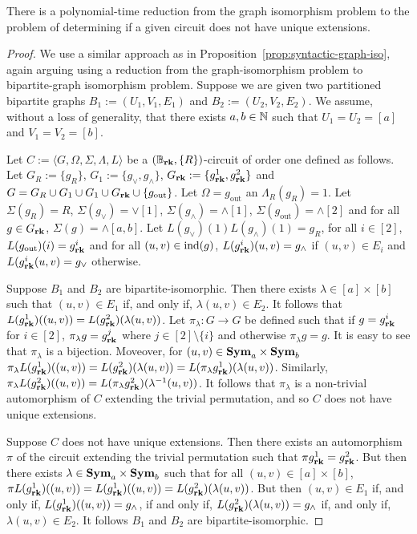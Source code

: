 \documentclass[../paper.tex]{subfiles}
\begin{document}
\begin{lem}
  There is a polynomial-time reduction from the graph isomorphism problem to the
  problem of determining if a given circuit does not have unique extensions.
  \label{lem:unique-extensions-hard}
\end{lem}
\begin{proof}
  We use a similar approach as in Proposition~\ref{prop:syntactic-graph-iso},
  again arguing using a reduction from the graph-isomorphism problem to
  bipartite-graph isomorphism problem. Suppose we are given two partitioned
  bipartite graphs $B_1 := (U_1, V_1, E_1)$ and $B_2 := (U_2, V_2, E_2)$. We
  assume, without a loss of generality, that there exists $a, b \in \mathbb{N}$ such
  that $U_1 = U_2 = [a]$ and $V_1 = V_2 = [b]$.

  Let $C := \langle G, \Omega, \Sigma, \Lambda, L \rangle$ be a $(\mathbb{B}_{\text{\textbf{rk}}},
  \{R\})$-circuit of order one defined as follows. Let $G_R := \{g_R\}$, $G_1 :=
  \{ g_{\lor}, g_{\land} \}$, $G_{\text{\textbf{rk}}} := \{ g^1_{\text{\textbf{rk}}}, g^2_{\text{\textbf{rk}}} \}$ and
  $G = G_R \cup G_1 \cup G_1 \cup G_{\text{\textbf{rk}}} \cup \{ g_{\text{out}} \}$. Let
  $\Omega = g_{\text{out}}$ an $\Lambda_R (g_R) = 1$. Let $\Sigma (g_R) = R$,
  $\Sigma (g_\lor) = \lor[1]$, $\Sigma (g_\land) = \land[1]$, $\Sigma
  (g_{\text{out}}) = \land[2]$ and for all $g \in G_{\text{\textbf{rk}}}$, $\Sigma (g) =
  \land[a,b]$. Let $L(g_\lor)(1) L(g_\land)(1) = g_R$, for all $i \in [2]$,
  $L(g_{\text{out}})(i) = g^i_{\text{\textbf{rk}}}$ and for all $(u, v) \in \text{\upshape ind}(g)$,
  $L(g^i_{\text{\textbf{rk}}})(u,v) = g_{\land}$ if $(u, v) \in E_i$ and $L(g^i_{\text{\textbf{rk}}} (u,v)
  = g_{\lor}$ otherwise.

  Suppose $B_1$ and $B_2$ are bipartite-isomorphic. Then there exists $\lambda
  \in [a] \times [b]$ such that $(u,v) \in E_1$ if, and only if, $\lambda (u,v)
  \in E_2$. It follows that $L(g^1_{\text{\textbf{rk}}})((u,v)) =
  L(g^2_{\text{\textbf{rk}}})(\lambda(u,v))$. Let $\pi_{\lambda}: G \rightarrow G$ be defined
  such that if $g = g^i_{\text{\textbf{rk}}}$ for $i \in [2]$, $\pi_{\lambda} g =
  g^j_{\text{\textbf{rk}}}$ where $j \in [2] \setminus \{i\}$ and otherwise $\pi_{\lambda} g
  = g$. It is easy to see that $\pi_{\lambda}$ is a bijection. Moveover, for
  $(u,v) \in \text{\textbf{Sym}}_a \times \text{\textbf{Sym}}_b$ $\pi_{\lambda} L(g^1_{\text{\textbf{rk}}})((u,v)) =
  L(g^2_{\text{\textbf{rk}}})(\lambda (u,v)) = L(\pi_\lambda g^1_{\text{\textbf{rk}}})(\lambda (u,v))$.
  Similarly, $\pi_\lambda L(g^2_{\text{\textbf{rk}}})((u,v)) =
  L(\pi_{\lambda}g^2_{\text{\textbf{rk}}})(\lambda^{-1}(u,v))$. It follows that $\pi_\lambda$
  is a non-trivial automorphism of $C$ extending the trivial permutation, and so
  $C$ does not have unique extensions.

  Suppose $C$ does not have unique extensions. Then there exists an automorphism
  $\pi$ of the circuit extending the trivial permutation such that $\pi
  g^1_{\text{\textbf{rk}}} = g^2_{\text{\textbf{rk}}}$. But then there exists $\lambda \in \text{\textbf{Sym}}_a \times
  \text{\textbf{Sym}}_b$ such that for all $(u,v) \in [a]\times [b]$, $\pi
  L(g^1_{\text{\textbf{rk}}})((u,v)) = L(g^1_{\text{\textbf{rk}}})((u,v)) = L(g^2_{\text{\textbf{rk}}})(\lambda
  (u,v))$. But then $(u,v) \in E_1$ if, and only if, $L(g^1_{\text{\textbf{rk}}})((u,v)) =
  g_{\land}$, if and only if, $L(g^2_{\text{\textbf{rk}}})(\lambda(u,v)) = g_{\land}$ if, and
  only if, $\lambda (u,v) \in E_2$. It follows $B_1$ and $B_2$ are
  bipartite-isomorphic.
\end{proof}
\end{document}
